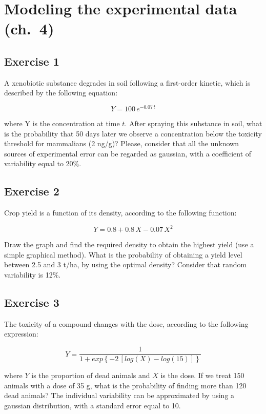 \documentclass[a4paper,12pt,oneside]{book}
\begin{document}
\hypertarget{modeling-the-experimental-data-ch.-4}{%
\section{Modeling the experimental data (ch.~4)}\label{modeling-the-experimental-data-ch.-4}}

\hypertarget{exercise-1-2}{%
\subsection{Exercise 1}\label{exercise-1-2}}

A xenobiotic substance degrades in soil following a first-order kinetic, which is described by the following equation:

\[Y = 100 \, e^{-0.07 \, t}\]

where Y is the concentration at time \(t\). After spraying this substance in soil, what is the probability that 50 days later we observe a concentration below the toxicity threshold for mammalians (2 ng/g)? Please, consider that all the unknown sources of experimental error can be regarded as gaussian, with a coefficient of variability equal to 20\%.

\hypertarget{exercise-2-2}{%
\subsection{Exercise 2}\label{exercise-2-2}}

Crop yield is a function of its density, according to the following function:

\[ Y = 0.8 + 0.8 \, X - 0.07 \, X^2\]

Draw the graph and find the required density to obtain the highest yield (use a simple graphical method). What is the probability of obtaining a yield level between 2.5 and 3 t/ha, by using the optimal density? Consider that random variability is 12\%.

\hypertarget{exercise-3-2}{%
\subsection{Exercise 3}\label{exercise-3-2}}

The toxicity of a compound changes with the dose, according to the following expression:

\[ Y = \frac{1}{1 + exp\left\{ -2 \, \left[log(X) - log(15)\right] \right\}}\]

where \(Y\) is the proportion of dead animals and \(X\) is the dose. If we treat 150 animals with a dose of 35 g, what is the probability of finding more than 120 dead animals? The individual variability can be approximated by using a gaussian distribution, with a standard error equal to 10.
\end{document}
